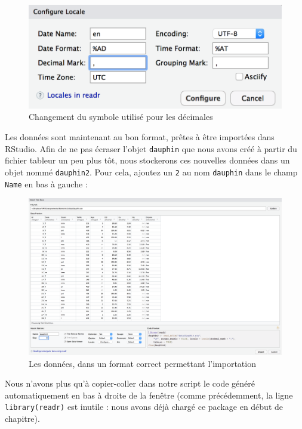 \documentclass[
  a4paper,
]{article}
\begin{document}
\begin{figure}[htpb]

{\centering \includegraphics[width=0.5\linewidth]{images/importcsv3} 

}

\caption{Changement du symbole utilisé pour les décimales}\label{fig:importcsv3}
\end{figure}

Les données sont maintenant au bon format, prêtes à être importées dans RStudio. Afin de ne pas écraser l'objet \texttt{dauphin} que nous avons créé à partir du fichier tableur un peu plus tôt, nous stockerons ces nouvelles données dans un objet nommé \texttt{dauphin2}. Pour cela, ajoutez un \texttt{2} au nom \texttt{dauphin} dans le champ \texttt{Name} en bas à gauche :

\begin{figure}[htpb]

{\centering \includegraphics[width=1\linewidth]{images/importcsv4} 

}

\caption{Les données, dans un format correct permettant l'importation}\label{fig:importcsv4}
\end{figure}

Nous n'avons plus qu'à copier-coller dans notre script le code généré automatiquement en bas à droite de la fenêtre (comme précédemment, la ligne \texttt{library(readr)} est inutile : nous avons déjà chargé ce package en début de chapitre).
\end{document}
